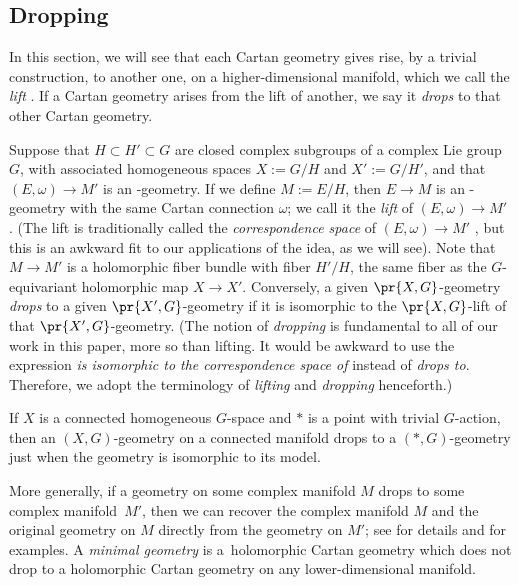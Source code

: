 \documentclass[10pt,a4paper]{amsart}
\numberwithin{equation}{section}
\begin{document}
\subsection{Dropping}
In this section, we will see that each Cartan geometry gives rise, by a trivial construction, to another one, on a higher-dimensional manifold, which we call the \emph{lift} \cite[Section 9]{mckay2023introduction}.
If a Cartan geometry arises from the lift of another, we say it \emph{drops} to that other Cartan geometry.

Suppose that $H \subset H' \subset G$ are closed complex subgroups of a complex Lie group $G$, with associated homogeneous
spaces $X := G/H$ and $X' := G/H'$, and that $(E, \omega) \to M'$ is an -geometry.
If we define $M := E/H$, then $E \to M$ is an -geometry with the same Cartan connection $\omega$;
we call it the \emph{lift} of $(E, \omega) \to M'$ \cite[Section~1.5.13]{Cap/Slovak:2009}.
(The lift is traditionally called the \emph{correspondence space} of $(E, \omega) \to M'$ \cite[Section~1.5.13]{Cap/Slovak:2009}, but this is an awkward fit to our applications of the idea, as we will see).
Note that $M \to M'$ is a holomorphic fiber bundle
with fiber $H'/H$, the same fiber as the $G$-equivariant holomorphic map $X \to X'$.
Conversely, a given $\pr{X, G}$-geometry \emph{drops} to a given $\pr{X',G}$-geometry if it is isomorphic to the $\pr{X, G}$-lift
of that $\pr{X', G}$-geometry.
(The notion of \emph{dropping} is fundamental to all of our work in this paper, more so than lifting. It would be awkward to use the expression \emph{is isomorphic to the correspondence space of} instead of \emph{drops to}.
Therefore, we adopt the terminology of \emph{lifting} and \emph{dropping} henceforth.)

\begin{Example}
If $X$ is a connected homogeneous $G$-space and $*$ is a point with trivial $G$-action, then an $(X, G)$-geometry on a
connected manifold drops to a $(*, G)$-geometry just when the geometry is isomorphic to its model.
\end{Example}

More generally, if a geometry on some complex manifold $M$ drops to some complex manifold~$M'$, then we can recover the complex manifold $M$ and the original geometry on $M$ directly from the geometry on $M'$; see \cite{Biswas.McKay:2016} for details and \cite{McKay2011b} for examples.
A \emph{minimal geometry} is a~holomorphic Cartan geometry which does not drop to a holomorphic Cartan geometry on any lower-dimensional manifold.
\end{document}
